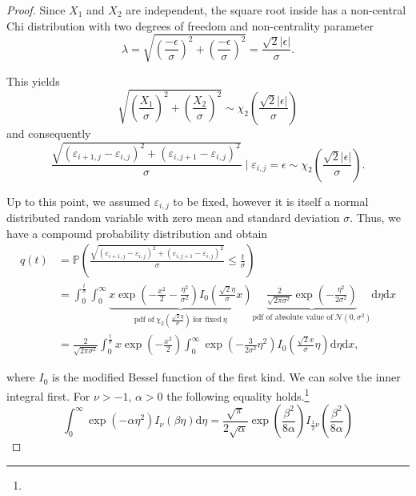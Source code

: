 \documentclass[a4paper,12pt]{article}
\newcommand{\abs}[1]{\lvert#1\rvert}
\theoremstyle{plain}
\theoremstyle{definition}
\begin{document}
\begin{proof}
	Since $X_1$ and $X_2$ are independent, the square root inside has a non-central Chi distribution with two degrees of freedom and non-centrality parameter
	\begin{equation*}
		\lambda = \sqrt{\left( \frac{- \epsilon}{\sigma} \right)^2 + \left( \frac{- \epsilon}{\sigma} \right)^2} = \frac{\sqrt{2} \abs{\epsilon}}{\sigma}.
	\end{equation*}
	
	This yields
	\begin{equation*}
		\sqrt{\left( \frac{X_1}{\sigma} \right)^2 + \left( \frac{X_2}{\sigma} \right)^2} \sim \chi_2 \left( \frac{\sqrt{2} \abs{\epsilon}}{\sigma} \right)
	\end{equation*}
	and consequently
	\begin{equation*}
		\frac{\sqrt{(\varepsilon_{i + 1, j} - \varepsilon_{i, j})^2 + (\varepsilon_{i, j + 1} - \varepsilon_{i, j})^2}}{\sigma} \mid \varepsilon_{i, j} = \epsilon \sim \chi_2 \left( \frac{\sqrt{2} \abs{\epsilon}}{\sigma} \right).
	\end{equation*}
	
	Up to this point, we assumed $\varepsilon_{i, j}$ to be fixed, however it is itself a normal distributed random variable with zero mean and standard deviation $\sigma$. Thus, we have a compound probability distribution and obtain
	\begin{align*}
		q(t) &= \mathbb{P}\left( \frac{\sqrt{(\varepsilon_{i + 1, j} - \varepsilon_{i, j})^2 + (\varepsilon_{i, j + 1} - \varepsilon_{i, j})^2}}{\sigma} \leq \frac{t}{\sigma} \right) \\
		&= \int_0^\frac{t}{\sigma} \int_0^\infty \underbrace{x \exp \left( - \frac{x^2}{2} - \frac{\eta^2}{\sigma^2} \right) I_0 \left( \frac{\sqrt{2} \eta}{\sigma} x \right)}_{\textrm{pdf of} \ \chi_2 \left( \frac{\sqrt{2} \eta}{\sigma} \right) \ \textrm{for fixed} \ \eta} \underbrace{\frac{2}{\sqrt{2 \pi \sigma^2}} \exp \left( - \frac{\eta^2}{2 \sigma^2} \right)}_{\textrm{pdf of absolute value of} \ \mathcal{N}(0, \sigma^2)} \mathrm{d}\eta \mathrm{d}x \\
		&= \frac{2}{\sqrt{2 \pi \sigma^2}} \int_0^\frac{t}{\sigma} x \exp \left( - \frac{x^2}{2} \right) \int_0^\infty \exp \left( - \frac{3}{2 \sigma^2} \eta^2 \right) I_0 \left( \frac{\sqrt{2} x}{\sigma} \eta \right) \mathrm{d}\eta \mathrm{d}x,
	\end{align*}
	
	where $I_0$ is the modified Bessel function of the first kind. We can solve the inner integral first. For $\nu > -1$, $\alpha > 0$ the following equality holds.\footnote{}
	\begin{equation}\label{eq: intbessel}
		\int_0^\infty \exp \left( - \alpha \eta^2 \right) I_\nu ( \beta \eta ) \mathrm{d}\eta = \frac{\sqrt{\pi}}{2 \sqrt{\alpha}} \exp \left( \frac{\beta^2}{8 \alpha} \right) I_{\frac{1}{2} \nu} \left( \frac{\beta^2}{8 \alpha} \right)
	\end{equation}
	

\end{proof}
\end{document}
